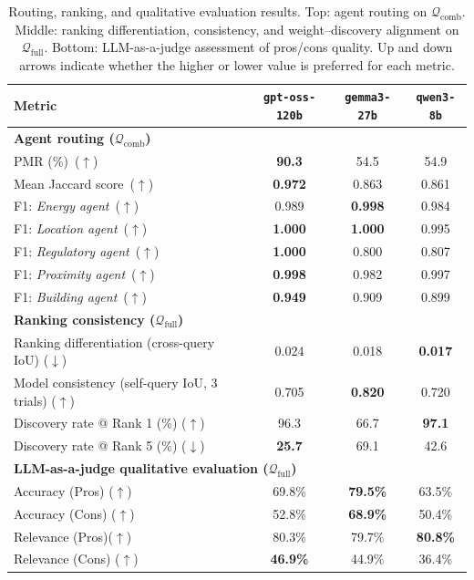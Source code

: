 \documentclass[runningheads,orivec]{llncs}
\newcommand{\locationagent}{\textit{Location agent}}
\newcommand{\energyagent}{\textit{Energy agent}}
\newcommand{\proximityagent}{\textit{Proximity agent}}
\newcommand{\regulatoryagent}{\textit{Regulatory agent}}
\newcommand{\buildingagent}{\textit{Building agent}}
\newcommand{\gptoss}{\texttt{gpt-oss-120b}}
\newcommand{\gemma}{\texttt{gemma3-27b}}
\newcommand{\qwen}{\texttt{qwen3-8b}}
\newcommand{\combqueries}{$\mathcal{Q}_\text{comb}$}
\newcommand{\completequeries}{$\mathcal{Q}_\text{full}$}
\begin{document}
\begin{table}[ht]
\centering
\caption{Routing, ranking, and qualitative evaluation results. Top: agent routing on \(\mathcal{Q}_{\mathrm{comb}}\). Middle: ranking differentiation, consistency, and weight–discovery alignment on \(\mathcal{Q}_{\mathrm{full}}\). Bottom: LLM-as-a-judge assessment of pros/cons quality. Up and down arrows indicate whether the higher or lower value is preferred for each metric.
}
\label{tab:routing_ranking_qualitative_combined}
\small
\begin{tabular}{lccc}
\toprule
\textbf{Metric} & \textbf{\gptoss} & \textbf{\gemma} & \textbf{\qwen} \\
\midrule
\multicolumn{4}{l}{\textbf{Agent routing (\combqueries)}} \\
PMR (\%)\ ($\uparrow$)  & \textbf{90.3}  & 54.5  & 54.9  \\
Mean Jaccard score\ ($\uparrow$)         & \textbf{0.972} & 0.863 & 0.861 \\
F1: \energyagent\ ($\uparrow$)           & 0.989 & \textbf{0.998} & 0.984 \\
F1: \locationagent\ ($\uparrow$)         & \textbf{1.000} & \textbf{1.000} & 0.995 \\
F1: \regulatoryagent\ ($\uparrow$)      & \textbf{1.000} & 0.800 & 0.807 \\
F1: \proximityagent\ ($\uparrow$)        & \textbf{0.998} & 0.982 & 0.997 \\
F1: \buildingagent\ ($\uparrow$)         & \textbf{0.949} & 0.909 & 0.899 \\
\midrule
\multicolumn{4}{l}{\textbf{Ranking consistency (\completequeries)}} \\
Ranking differentiation (cross-query IoU) ($\downarrow$) & 0.024      & 0.018      & \textbf{0.017}      \\
Model consistency (self-query IoU, 3 trials) ($\uparrow$)   & 0.705      & \textbf{0.820}      & 0.720      \\
Discovery rate @ Rank 1 (\%)  ($\uparrow$)            & 96.3       & 66.7       & \textbf{97.1}       \\
Discovery rate @ Rank 5 (\%) ($\downarrow$)             & \textbf{25.7}       & 69.1       & 42.6       \\
\midrule
\multicolumn{4}{l}{\textbf{LLM-as-a-judge qualitative evaluation (\completequeries)}} \\
Accuracy (Pros) ($\uparrow$)  & 69.8\% & \textbf{79.5\%} & 63.5\% \\
Accuracy (Cons) ($\uparrow$)  & 52.8\% & \textbf{68.9\%} & 50.4\% \\
Relevance (Pros)($\uparrow$) & 80.3\% & 79.7\% & \textbf{80.8\%} \\
Relevance (Cons) ($\uparrow$) & \textbf{46.9\%} & 44.9\% & 36.4\% \\
\bottomrule
\end{tabular}
\end{table}
\end{document}
